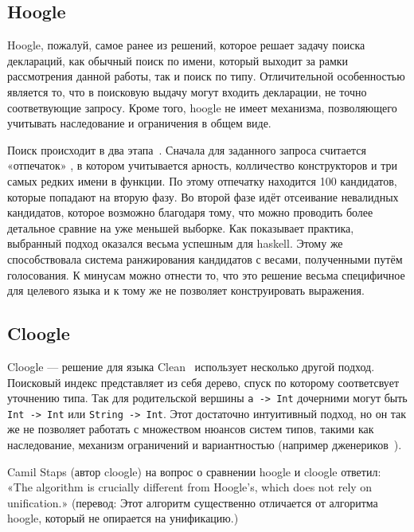 \documentclass[times]{itmo-student-thesis}
\begin{document}
	\subsection{Hoogle}
	Hoogle, пожалуй, самое ранее из решений, которое решает задачу поиска деклараций, как обычный поиск по имени, который выходит за рамки рассмотрения данной работы, так и поиск по типу. Отличительной особенностью является то, что в поисковую выдачу могут входить декларации, не точно соответвующие запросу. Кроме того, hoogle не имеет механизма, позволяющего учитывать наследование и ограничения в общем виде. 
	
	Поиск происходит в два этапа~\cite{hooglereview}. Сначала для заданного запроса считается «отпечаток» , в котором учитывается арность, колличество конструкторов и три самых редких имени в функции. По этому отпечатку находится 100 кандидатов, которые попадают на вторую фазу. Во второй фазе идёт отсеивание невалидных кандидатов, которое возможно благодаря тому, что можно проводить более детальное сравние на уже меньшей выборке.  Как показывает практика, выбранный подход оказался весьма успешным для haskell. Этому же способствовала система ранжирования кандидатов с весами, полученными путём голосования. К минусам можно отнести то, что это решение весьма специфичное для целевого языка и к тому же не позволяет конструировать выражения. 
	
	\subsection{Cloogle}
	Cloogle --- решение для языка Clean~\cite{clean} использует несколько другой подход. Поисковый индекс представляет из себя дерево, спуск по которому соответсвует уточнению типа. Так для родительской вершины \lstinline{a -> Int} дочерними могут быть \lstinline{Int -> Int} или \lstinline{String -> Int}. Этот достаточно интуитивный подход, но он так же не позволяет работать с множеством нюансов систем типов, такими как наследование, механизм ограничений и вариантностью (например дженериков~\cite{kotlingenericsandvariance}). 
	
	Camil Staps (автор cloogle) на вопрос о сравнении hoogle и cloogle ответил: «The algorithm is crucially different from Hoogle's, which does not rely on unification.» (перевод: Этот алгоритм существенно отличается от алгоритма hoogle, который не опирается на унификацию.) 
	
\end{document}
